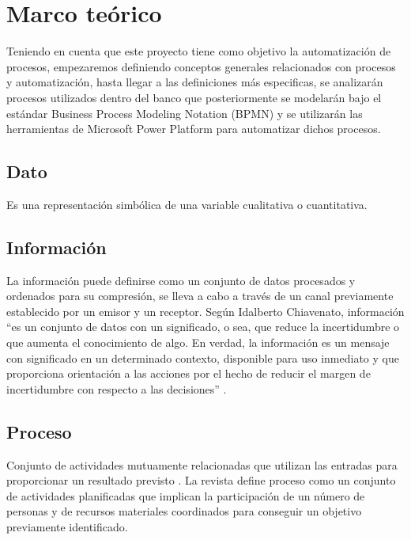 

\chapter{Marco teórico}
Teniendo en cuenta que este proyecto tiene como objetivo la automatización de procesos, empezaremos definiendo conceptos generales relacionados con procesos y automatización, hasta llegar a las definiciones más especificas, se analizarán procesos utilizados dentro del banco que posteriormente se modelarán bajo el estándar Business Process Modeling Notation (BPMN) y se utilizarán las herramientas de Microsoft Power Platform para automatizar dichos procesos.

\section{Dato}
Es una representación simbólica de una variable cualitativa o cuantitativa.

\section{Información}
La información puede definirse como un conjunto de datos procesados y ordenados para su compresión, se lleva a cabo a través de un canal previamente establecido por un emisor y un receptor.
Según Idalberto Chiavenato, información ``es un conjunto de datos con un significado, o sea, que reduce la incertidumbre o que aumenta el conocimiento de algo. En verdad, la información es un mensaje con significado en un determinado contexto, disponible para uso inmediato y que proporciona orientación a las acciones por el hecho de reducir el margen de incertidumbre con respecto a las decisiones'' \citep{chiavenato2019}.

\section{Proceso}
Conjunto de actividades mutuamente relacionadas que utilizan las entradas para proporcionar un resultado previsto \citep{ISO9000}.
\vspace{5mm} %
\hfill \break
La revista \citep{Revistacatalana1998} define proceso como un conjunto de actividades planificadas que implican la participación de un número de personas y de recursos materiales coordinados para conseguir un objetivo previamente identificado.

